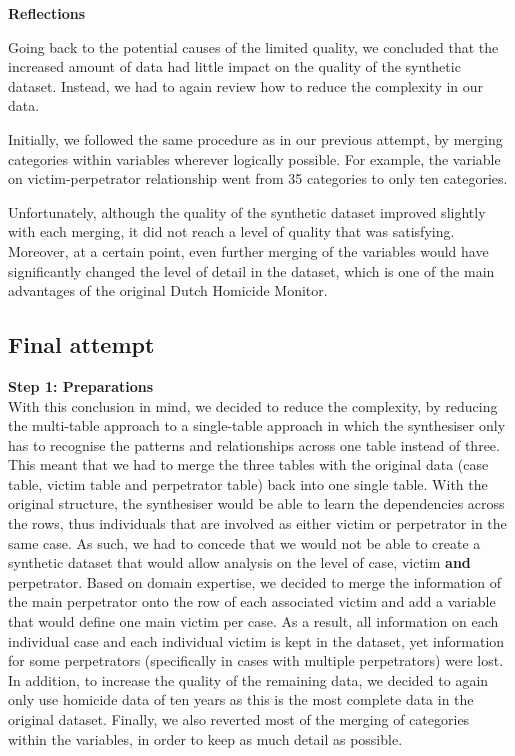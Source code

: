 \textbf{Reflections}

Going back to the potential causes of the limited quality, we concluded that the increased amount of data had little impact on the quality of the synthetic dataset. Instead, we had to again review how to reduce the complexity in our data.

Initially, we followed the same procedure as in our previous attempt, by merging categories within variables wherever logically possible. For example, the variable on victim-perpetrator relationship went from 35 categories to only ten categories.

Unfortunately, although the quality of the synthetic dataset improved slightly with each merging, it did not reach a level of quality that was satisfying. Moreover, at a certain point, even further merging of the variables would have significantly changed the level of detail in the dataset, which is one of the main advantages of the original Dutch Homicide Monitor.

\subsection{Final attempt}

\textbf{Step 1: Preparations}\\
With this conclusion in mind, we decided to reduce the complexity, by reducing the multi-table approach to a single-table approach in which the synthesiser only has to recognise the patterns and relationships across one table instead of three. This meant that we had to merge the three tables with the original data (case table, victim table and perpetrator table) back into one single table. With the original structure, the synthesiser would be able to learn the dependencies across the rows, thus individuals that are involved as either victim or perpetrator in the same case. As such, we had to concede that we would not be able to create a synthetic dataset that would allow analysis on the level of case, victim \textbf{and} perpetrator. Based on domain expertise, we decided to merge the information of the main perpetrator onto the row of each associated victim and add a variable that would define one main victim per case. As a result, all information on each individual case and each individual victim is kept in the dataset, yet information for some perpetrators (specifically in cases with multiple perpetrators) were lost. In addition, to increase the quality of the remaining data, we decided to again only use homicide data of ten years as this is the most complete data in the original dataset. Finally, we also reverted most of the merging of categories within the variables, in order to keep as much detail as possible.

